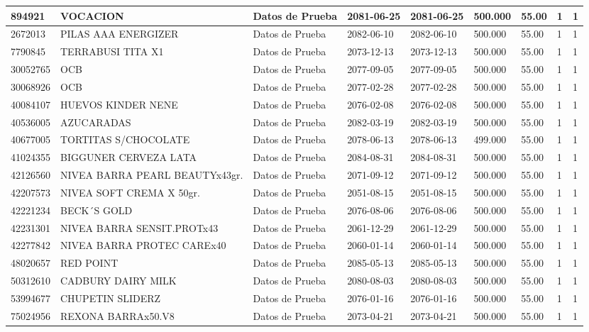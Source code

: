 \documentclass[a4paper,12pt]{article}
\begin{document}
\begin{landscape}
\begin{longtable}{|p{4cm}|p{2.5cm}|p{2.5cm}|p{1.8cm}|p{1.8cm}|p{1cm}|p{1cm}|p{3cm}|p{3cm}||}
894921 & VOCACION & Datos de Prueba & 2081-06-25 & 2081-06-25 & 500.000 & 55.00 & 1 & 1 \\ \hline 
2672013 & PILAS AAA ENERGIZER & Datos de Prueba & 2082-06-10 & 2082-06-10 & 500.000 & 55.00 & 1 & 1 \\ \hline 
7790845 & TERRABUSI TITA X1 & Datos de Prueba & 2073-12-13 & 2073-12-13 & 500.000 & 55.00 & 1 & 1 \\ \hline 
30052765 & OCB & Datos de Prueba & 2077-09-05 & 2077-09-05 & 500.000 & 55.00 & 1 & 1 \\ \hline 
30068926 & OCB & Datos de Prueba & 2077-02-28 & 2077-02-28 & 500.000 & 55.00 & 1 & 1 \\ \hline 
40084107 & HUEVOS KINDER NENE & Datos de Prueba & 2076-02-08 & 2076-02-08 & 500.000 & 55.00 & 1 & 1 \\ \hline 
40536005 & AZUCARADAS & Datos de Prueba & 2082-03-19 & 2082-03-19 & 500.000 & 55.00 & 1 & 1 \\ \hline 
40677005 & TORTITAS S/CHOCOLATE & Datos de Prueba & 2078-06-13 & 2078-06-13 & 499.000 & 55.00 & 1 & 1 \\ \hline 
41024355 & BIGGUNER CERVEZA LATA & Datos de Prueba & 2084-08-31 & 2084-08-31 & 500.000 & 55.00 & 1 & 1 \\ \hline 
42126560 & NIVEA BARRA PEARL BEAUTYx43gr. & Datos de Prueba & 2071-09-12 & 2071-09-12 & 500.000 & 55.00 & 1 & 1 \\ \hline 
42207573 & NIVEA SOFT CREMA X 50gr. & Datos de Prueba & 2051-08-15 & 2051-08-15 & 500.000 & 55.00 & 1 & 1 \\ \hline 
42221234 & BECK´S GOLD & Datos de Prueba & 2076-08-06 & 2076-08-06 & 500.000 & 55.00 & 1 & 1 \\ \hline 
42231301 & NIVEA BARRA SENSIT.PROTx43 & Datos de Prueba & 2061-12-29 & 2061-12-29 & 500.000 & 55.00 & 1 & 1 \\ \hline 
42277842 & NIVEA BARRA PROTEC CAREx40 & Datos de Prueba & 2060-01-14 & 2060-01-14 & 500.000 & 55.00 & 1 & 1 \\ \hline 
48020657 & RED  POINT & Datos de Prueba & 2085-05-13 & 2085-05-13 & 500.000 & 55.00 & 1 & 1 \\ \hline 
50312610 & CADBURY DAIRY MILK & Datos de Prueba & 2080-08-03 & 2080-08-03 & 500.000 & 55.00 & 1 & 1 \\ \hline 
53994677 & CHUPETIN SLIDERZ & Datos de Prueba & 2076-01-16 & 2076-01-16 & 500.000 & 55.00 & 1 & 1 \\ \hline 
75024956 & REXONA BARRAx50.V8 & Datos de Prueba & 2073-04-21 & 2073-04-21 & 500.000 & 55.00 & 1 & 1 \\ \hline 

\end{longtable}
\end{landscape}
\end{document}
